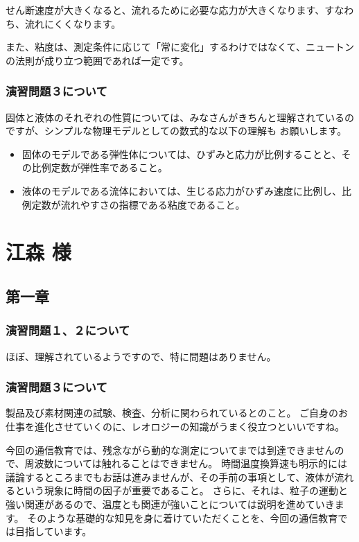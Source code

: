 \documentclass[uplatex,dvipdfmx,a4paper,11pt]{jsreport}
\begin{document}
せん断速度が大きくなると、流れるために必要な応力が大きくなります、すなわち、流れにくくなります。

また、粘度は、測定条件に応じて「常に変化」するわけではなくて、ニュートンの法則が成り立つ範囲であれば一定です。

\subsubsection*{演習問題３について}

固体と液体のそれぞれの性質については、みなさんがきちんと理解されているのですが、シンプルな物理モデルとしての数式的な以下の理解も
お願いします。
\begin{itemize}
    \item 固体のモデルである弾性体については、ひずみと応力が比例することと、その比例定数が弾性率であること。
    \item 液体のモデルである流体においては、生じる応力がひずみ速度に比例し、比例定数が流れやすさの指標である粘度であること。
\end{itemize}

\clearpage

\section*{江森 様}
\subsection*{第一章}
\subsubsection*{演習問題１、２について}
ほぼ、理解されているようですので、特に問題はありません。

\subsubsection*{演習問題３について}

製品及び素材関連の試験、検査、分析に関わられているとのこと。
ご自身のお仕事を進化させていくのに、レオロジーの知識がうまく役立つといいですね。

今回の通信教育では、残念ながら動的な測定についてまでは到達できませんので、周波数については触れることはできません。
時間温度換算速も明示的には議論するところまでもお話は進みませんが、その手前の事項として、液体が流れるという現象に時間の因子が重要であること。
さらに、それは、粒子の運動と強い関連があるので、温度とも関連が強いことについては説明を進めていきます。
そのような基礎的な知見を身に着けていただくことを、今回の通信教育では目指しています。
\end{document}
